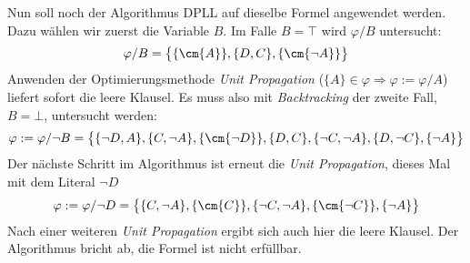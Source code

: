 \vspace{2em}

Nun soll noch der Algorithmus DPLL auf dieselbe Formel angewendet werden. Dazu wählen wir zuerst die Variable $B$. Im
Falle $B = \top$ wird $\varphi / B$ untersucht:
\[
  \varphi / B = \big\{ \{\cm{A}\}, \{D, C\}, \{\cm{\neg A}\} \big\}
\]
Anwenden der Optimierungsmethode \emph{Unit Propagation} ($\{A\} \in \varphi \Rightarrow \varphi := \varphi / A$)
liefert sofort die leere Klausel. Es muss also mit \emph{Backtracking} der zweite Fall, $B = \bot$, untersucht werden:
\[
  \varphi := \varphi / \neg B = \big\{ \{\neg D, A\}, \{C, \neg A\}, \{\cm{\neg D}\}, \{D, C\}, \{\neg C, \neg A\},
  \{D, \neg C\}, \{\neg A\} \big\}
\]
Der nächste Schritt im Algorithmus ist erneut die \emph{Unit Propagation}, dieses Mal mit dem Literal $\neg D$
\[
  \varphi := \varphi / \neg D = \big\{ \{C, \neg A\}, \{\cm{C}\}, \{\neg C, \neg A\}, \{\cm{\neg C}\}, \{\neg A\} \big\}
\]
Nach einer weiteren \emph{Unit Propagation} ergibt sich auch hier die leere Klausel. Der Algorithmus bricht ab, die
Formel ist nicht erfüllbar.



